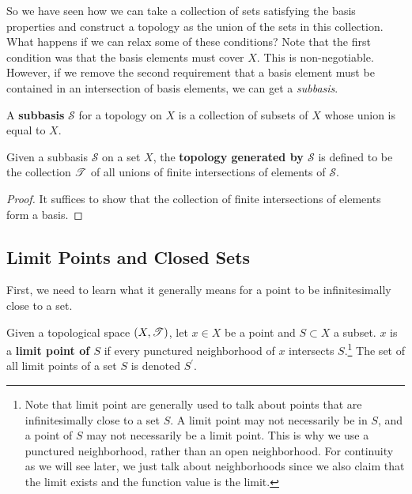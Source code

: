   So we have seen how we can take a collection of sets satisfying the basis properties and construct a topology as the union of the sets in this collection. What happens if we can relax some of these conditions? Note that the first condition was that the basis elements must cover $X$. This is non-negotiable. However, if we remove the second requirement that a basis element must be contained in an intersection of basis elements, we can get a \textit{subbasis}. 

  \begin{definition}[Subbasis]
    A \textbf{subbasis} $\mathscr{S}$ for a topology on $X$ is a collection of subsets of $X$ whose union is equal to $X$. 
  \end{definition}

  \begin{theorem}
    Given a subbasis $\mathscr{S}$ on a set $X$, the \textbf{topology generated by $\mathscr{S}$} is defined to be the collection $\operatorname{\mathscr{T}}$ of all unions of finite intersections of elements of $\mathscr{S}$. 
  \end{theorem}
  \begin{proof}
    It suffices to show that the collection of finite intersections of elements form a basis. 
  \end{proof}
 
\subsection{Limit Points and Closed Sets} 

  First, we need to learn what it generally means for a point to be infinitesimally close to a set. 

  \begin{definition}
    Given a topological space $(X, \operatorname{\mathscr{T}})$, let $x \in X$ be a point and $S \subset X$ a subset. $x$ is a \textbf{limit point of $S$} if every punctured neighborhood of $x$ intersects $S$.\footnote{Note that limit point are generally used to talk about points that are infinitesimally close to a set $S$. A limit point may not necessarily be in $S$, and a point of $S$ may not necessarily be a limit point. This is why we use a punctured neighborhood, rather than an open neighborhood. For continuity as we will see later, we just talk about neighborhoods since we also claim that the limit exists and the function value is the limit.} The set of all limit points of a set $S$ is denoted $S^\prime$.  
  \end{definition} 

